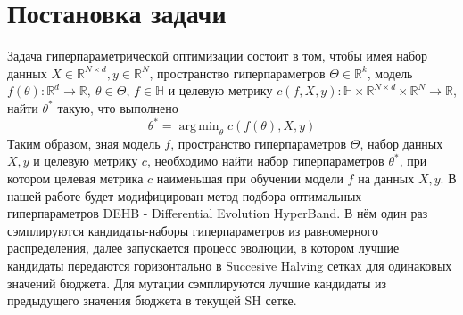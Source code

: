 \documentclass{article}
\DeclareMathOperator*{\argmin}{arg\,min}
\begin{document}
\section{Постановка задачи}
Задача гиперпараметрической оптимизации состоит в том, чтобы имея набор данных $X \in \mathbb{R}^{N\times d}, y \in \mathbb{R}^{N}$, пространство гиперпараметров $\Theta \in \mathbb{R}^k$, модель $f(\theta): \mathbb{R}^{d} \to \mathbb{R},\ \theta \in \Theta$, $f \in \mathbb{H}$ и целевую метрику $c(f, X, y): \mathbb{H} \times \mathbb{R}^{N\times d} \times \mathbb{R}^{N} \to \mathbb{R}$, найти $\theta^*$ такую, что выполнено
$$\theta^* = \argmin_{\theta} c(f(\theta), X, y)$$
Таким образом, зная модель $f$, пространство гиперпараметров $\Theta$, набор данных $X, y$ и целевую метрику $c$, необходимо найти набор гиперпараметров $\theta^*$, при котором целевая метрика $c$ наименьшая при обучении модели $f$ на данных $X, y$.
В нашей работе будет модифицирован метод подбора оптимальных гиперпараметров DEHB - Differential Evolution HyperBand. В нём  один раз сэмплируются кандидаты-наборы гиперпараметров из равномерного распределения, далее запускается процесс эволюции, в котором лучшие кандидаты передаются горизонтально в Succesive Halving сетках для одинаковых значений бюджета. Для мутации сэмплируются лучшие кандидаты из предыдущего значения бюджета в текущей SH сетке.





\end{document}
